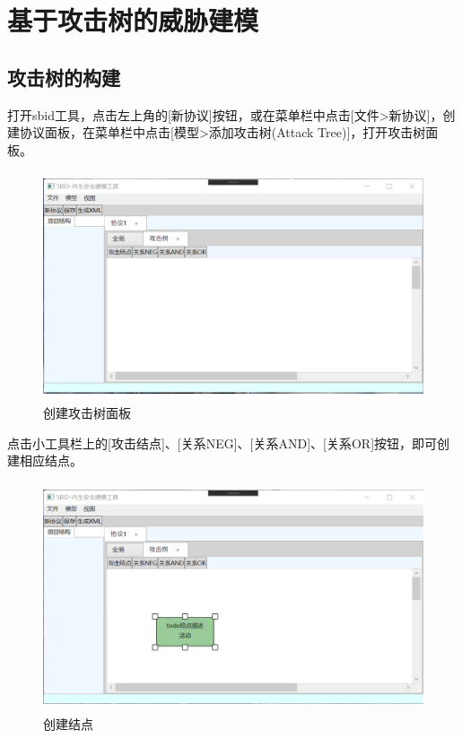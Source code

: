 \chapter{基于攻击树的威胁建模}

\section{攻击树的构建}
打开sbid工具，点击左上角的[新协议]按钮，或在菜单栏中点击[文件>新协议]，创建协议面板，在菜单栏中点击[模型>添加攻击树(Attack Tree)]，打开攻击树面板。

\begin{figure}[h]
	\centering
	\includegraphics[width=12cm,height=6.75cm]{imgs/attack_tree_panel.png}
	\caption{创建攻击树面板}
	\label{attack_tree_panel}
\end{figure}

\par
点击小工具栏上的[攻击结点]、[关系NEG]、[关系AND]、[关系OR]按钮，即可创建相应结点。

\begin{figure}[h]
	\centering
	\includegraphics[width=12cm,height=6.75cm]{imgs/attack_tree_create_node.png}
	\caption{创建结点}
	\label{attack_tree_create_node}
\end{figure}

